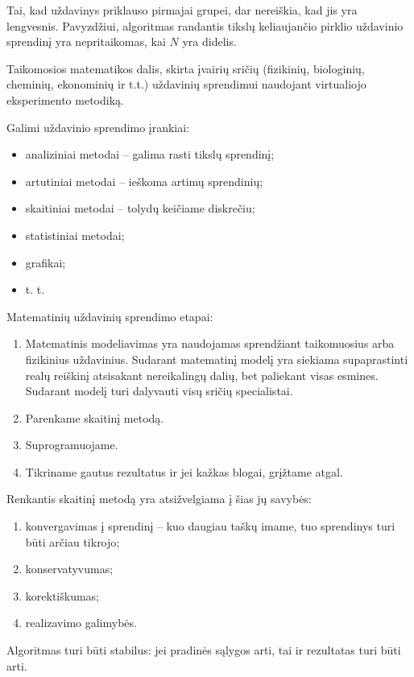 \begin{note}
  Tai, kad uždavinys priklauso pirmajai grupei, dar nereiškia, kad jis yra
  lengvesnis. Pavyzdžiui, algoritmas randantis tikslų keliaujančio pirklio
  uždavinio sprendinį yra nepritaikomas, kai $N$ yra didelis.
\end{note}


\begin{defn}
  Taikomosios matematikos dalis, skirta įvairių sričių (fizikinių, biologinių,
  cheminių, ekonominių ir t.t.) uždavinių sprendimui naudojant virtualiojo
  eksperimento metodiką.
\end{defn}
Galimi uždavinio sprendimo įrankiai:
\begin{itemize}
  \item analiziniai metodai – galima rasti tikslų sprendinį;
  \item artutiniai metodai – ieškoma artimų sprendinių;
  \item skaitiniai metodai – tolydų keičiame diskrečiu;
  \item statistiniai metodai;
  \item grafikai;
  \item t. t.
\end{itemize}

Matematinių uždavinių sprendimo etapai:
\begin{enumerate}
  \item Matematinis modeliavimas yra naudojamas sprendžiant
    taikomuosius arba fizikinius uždavinius. Sudarant matematinį
    modelį yra siekiama supaprastinti realų reiškinį atsisakant
    nereikalingų dalių, bet paliekant visas esmines. Sudarant modelį
    turi dalyvauti visų sričių specialistai.
  \item Parenkame skaitinį metodą.
  \item Suprogramuojame.
  \item Tikriname gautus rezultatus ir jei kažkas blogai, grįžtame atgal.
\end{enumerate}

Renkantis skaitinį metodą yra atsižvelgiama į šias jų savybės:
\begin{enumerate}
  \item konvergavimas į sprendinį – kuo daugiau taškų imame, tuo sprendinys
    turi būti arčiau tikrojo;
  \item konservatyvumas;
  \item korektiškumas;
  \item realizavimo galimybės.
\end{enumerate}
Algoritmas turi būti stabilus: jei pradinės sąlygos arti, tai ir rezultatas
turi būti arti.


